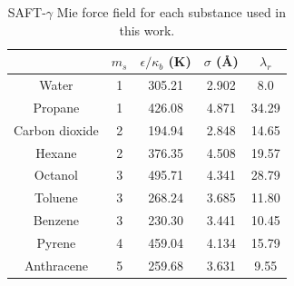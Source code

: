 \begin{table}[h]
	\centering
	\caption{SAFT-$\gamma$ Mie force field for each substance used in this work.}
	\label{tbl:parameters}
	\begin{tabular}{ccccc}
		\hline
		\hline
		& $m_s$ & $\epsilon/\kappa_{b}$ (K) & $\sigma$ (\AA) & $\lambda_r$ \\ \hline\hline
		Water          & 1     & 305.21               & 2.902              & 8.0         \\
		Propane        & 1     & 426.08               & 4.871              & 34.29       \\
		Carbon dioxide & 2     & 194.94               & 2.848              & 14.65       \\
		Hexane         & 2     & 376.35               & 4.508              & 19.57       \\
		Octanol        & 3     & 495.71               & 4.341              & 28.79       \\
		Toluene        & 3     & 268.24               & 3.685              & 11.80       \\
		Benzene        & 3     & 230.30               & 3.441              & 10.45       \\
		Pyrene         & 4     & 459.04               & 4.134              & 15.79       \\
		Anthracene     & 5     & 259.68               & 3.631              & 9.55        \\ 
		\hline
		\hline
	\end{tabular}
	
\end{table}
\FloatBarrier
